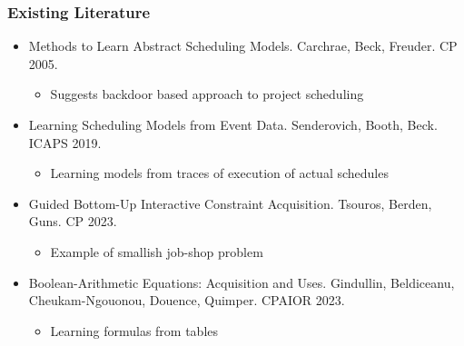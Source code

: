 \documentclass[dvipsnames,aspectratio=169]{beamer}
\begin{document}
\begin{frame}
\frametitle{Existing Literature}
\begin{itemize}
\item Methods to Learn Abstract Scheduling Models. Carchrae, Beck, Freuder. CP 2005.~\cite{CarchraeBF05}
\begin{itemize}
\item Suggests backdoor based approach to project scheduling
\end{itemize}
\item Learning Scheduling Models from Event Data. Senderovich, Booth, Beck. ICAPS 2019.~\cite{SenderovichBB19}
\begin{itemize}
\item Learning models from traces of execution of actual schedules
\end{itemize}
\item Guided Bottom-Up Interactive Constraint Acquisition. Tsouros, Berden, Guns. CP 2023.~\cite{TsourosBG23}
\begin{itemize}
\item Example of smallish job-shop problem
\end{itemize}
\item Boolean-Arithmetic Equations: Acquisition and Uses. Gindullin, Beldiceanu, Cheukam-Ngouonou, Douence, Quimper. CPAIOR 2023.~\cite{GindullinBCDQ23}
\begin{itemize}
\item Learning formulas from tables
\end{itemize}

\end{itemize}
\end{frame}
\end{document}
